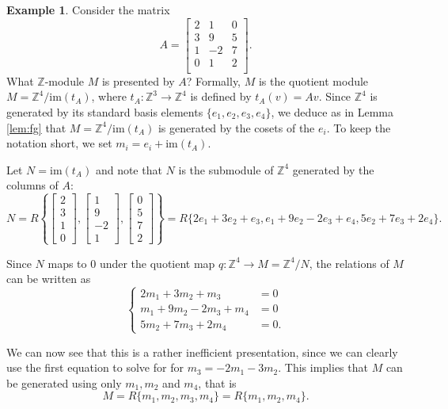 \documentclass[12pt]{report}
\numberwithin{equation}{section}
\numberwithin{theorem}{chapter}
\theoremstyle{definition}
\newtheorem{example}[theorem]{Example}
\newtheorem*{basic properties}{Basic Properties}
\newtheorem*{Important Remark}{Important Remark}
\begin{document}
\begin{example}
Consider the matrix
$$
A =
\begin{bmatrix}
2 & 1 & 0 \\
3 & 9 & 5 \\
1 & -2 & 7 \\
0 & 1 & 2 \\
\end{bmatrix}.
$$
What $\mathbb{Z}$-module $M$ is presented by $A$?
Formally, $M$ is the quotient module $M=\mathbb{Z}^4/\mathrm{im}(t_A)$, where $t_A \!:\mathbb{Z}^3 \to \mathbb{Z}^4$ is defined by $t_A(v)=Av$. Since $\mathbb{Z}^4$ is generated by its standard basis elements $\{e_1,e_2,e_3,e_4\}$, we deduce as in Lemma \ref{lem:fg} that $M=\mathbb{Z}^4/\mathrm{im}(t_A)$ is generated by the cosets of the $e_i$. To keep the notation short, we set $m_i=e_i+\mathrm{im}(t_A)$.



Let $N=\mathrm{im}(t_A)$ and note that $N$ is the submodule of $\mathbb{Z}^4$ generated by the columns of $A$:
$$N=R\left\{\begin{bmatrix} 2 \\ 3 \\ 1\\ 0 \end{bmatrix}, \begin{bmatrix} 1 \\ 9 \\ -2 \\1 \end{bmatrix},\begin{bmatrix} 0 \\ 5 \\ 7\\2 \end{bmatrix}\right\}=R\{2e_1 + 3e_2 + e_3,e_1 + 9e_2 -2 e_3 + e_4, 5e_2 + 7 e_3 + 2 e_4  \}.$$

Since $N$ maps to $0$ under the quotient map $q\!:\mathbb{Z}^4\to M=\mathbb{Z}^4/N$, the relations of $M$ 
can be written as
$$
\begin{cases}
2m_1 + 3m_2 + m_3 & = 0 \\
m_1 + 9m_2 -2 m_3 + m_4 & = 0 \\
5m_2 + 7 m_3 + 2 m_4 & = 0. 
\end{cases}
$$

We can now see that this is a rather inefficient presentation, since we can clearly use the first equation to solve for for $m_3=-2m_1 - 3m_2$. This implies that $M$ can be generated using only $m_1, m_2$ and $m_4$, that is
$$M=R\{m_1,m_2,m_3,m_4\}=R\{m_1,m_2,m_4\}.$$


\end{example}
\end{document}
